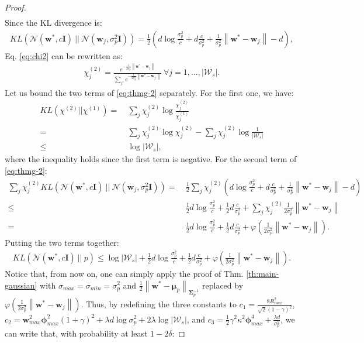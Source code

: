 \documentclass{article}
\newcommand{\norm}[1]{\left\lVert #1 \right\rVert}
\newcommand{\abs}[1]{\left\lvert #1 \right\rvert}
\begin{document}
\begin{proof}
\begin{align}
\end{align}
Since the KL divergence is:
\begin{align*}
KL(\mathcal{N}(\bm{w}^*,c\bm{I})\ ||\ \mathcal{N}(\bm{w}_j, \sigma_p^2\bm{I})) = \frac{1}{2}\left( d\log\frac{\sigma^2_p}{c} + d\frac{c}{\sigma^2_p} + \frac{1}{\sigma^2_p}\norm{\bm{w}^* - \bm{w}_j} - d\right),
\end{align*}
Eq. \eqref{eq:chi2} can be rewritten as:
\begin{align*}
\chi^{(2)}_j = \frac{e^{-\frac{1}{2\sigma^2_p}\norm{\bm{w}^* - \bm{w}_j}}}{\sum_{j'}e^{-\frac{1}{2\sigma^2_p}\norm{\bm{w}^* - \bm{w}_{j'}}}}\ \forall j = 1,\dots,\abs{\mathcal{W}_s}.
\end{align*}
Let us bound the two terms of \eqref{eq:thmg-2} separately. For the first one, we have:
\begin{align*}
KL(\chi^{(2)}||\chi^{(1)}) =\ & \sum_j \chi^{(2)}_j \log\frac{\chi^{(2)}_j}{\chi^{(1)}_j}\\ =\ & \sum_j \chi^{(2)}_j \log\chi^{(2)}_j - \sum_j \chi^{(2)}_j \log\frac{1}{\abs{\mathcal{W}_s}}\\ \leq\ & \log\abs{\mathcal{W}_s},
\end{align*}
where the inequality holds since the first term is negative. For the second term of \eqref{eq:thmg-2}:
\begin{align*}
\sum_{j} \chi^{(2)}_{j}KL(\mathcal{N}(\bm{w}^*,c\bm{I})\ ||\ \mathcal{N}(\bm{w}_j, \sigma_p^2\bm{I})) =\ & \frac{1}{2}\sum_{j} \chi^{(2)}_{j}\left( d\log\frac{\sigma^2_p}{c} + d\frac{c}{\sigma^2_p} + \frac{1}{\sigma^2_p}\norm{\bm{w}^* - \bm{w}_j} - d\right)\\ \leq\ & \frac{1}{2}d\log\frac{\sigma^2_p}{c} + \frac{1}{2}d\frac{c}{\sigma^2_p} + \sum_{j} \chi^{(2)}_{j}\frac{1}{2\sigma^2_p}\norm{\bm{w}^* - \bm{w}_j}\\ =\ & \frac{1}{2}d\log\frac{\sigma^2_p}{c} + \frac{1}{2}d\frac{c}{\sigma^2_p} + \varphi\left(\frac{1}{2\sigma^2_p}\norm{\bm{w}^* - \bm{w}_j}\right).
\end{align*}
Putting the two terms together:
\begin{align*}
KL(\mathcal{N}(\bm{w}^*,c\bm{I})\ ||\ p) \leq \log\abs{\mathcal{W}_s} + \frac{1}{2}d\log\frac{\sigma^2_p}{c} + \frac{1}{2}d\frac{c}{\sigma^2_p} + \varphi\left(\frac{1}{2\sigma^2_p}\norm{\bm{w}^* - \bm{w}_j}\right).
\end{align*}
Notice that, from now on, one can simply apply the proof of Thm. \ref{th:main-gaussian} with $\sigma_{max}=\sigma_{min}=\sigma^2_p$ and $\frac{1}{2}\norm{\bm{w}^* - \bm{\mu}_p}_{\bm{\Sigma}_p^{-1}}$ replaced by $\varphi\left(\frac{1}{2\sigma^2_p}\norm{\bm{w}^* - \bm{w}_j}\right)$. Thus, by redefining the three constants to $c_1 = \frac{8R_{max}^2}{\sqrt{2}(1-\gamma)^2}$, $c_2 = \bm{w}_{max}^2\bm{\phi}_{max}^2(1 + \gamma)^2 + \lambda d \log\sigma^2_p + 2\lambda\log\abs{\mathcal{W}_s}$, and $c_3 = \frac{1}{2}\gamma^2\kappa^2\bm{\phi}_{max}^4 + \frac{\lambda d}{\sigma^2_p}$, we can write that, with probability at least $1-2\delta$:

\end{proof}
\end{document}

